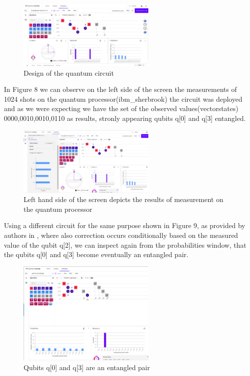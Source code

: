 \documentclass[12pt]{ieeetj}
\begin{document}
		\begin{figure}[H]
			\centering
			\includegraphics[width=0.6\textwidth]{ibmq/a.png}
			\caption{Design of the quantum circuit}
			\label{fig7:}
		\end{figure}		
		

		In Figure 8 we can observe on the left side of the screen the measurements of 1024 shots on the quantum processor(ibm\_sherbrook)
		the circuit was deployed and as we were expecting we have the set of the observed values(vectorstates)
		0000,0010,0010,0110 as results, stronly appearing qubits q[0] and q[3] entangled.

		\begin{figure}[H]
			\centering
			\includegraphics[width=0.6\textwidth]{ibmq/b.png}
			\caption{Left hand side of the screen depicts the results of measurement on the quantum processor}
			\label{fig8:}
		\end{figure}		
	


		Using a different circuit for the same purpose shown in Figure 9, as provided by authors in \cite{brief-intro},
		where also correction occurs conditionally based on the measured value of the qubit q[2],
		we can inspect again from the probabilities window, that the qubits q[0] and q[3] become eventually an entangled pair.

		\begin{figure}[H]
			\centering
			\includegraphics[width=0.6\textwidth]{ibmq/yale_circuit.png}
			\caption{Qubits q[0] and q[3] are an entangled pair}
			\label{fig9:}
		\end{figure}		
		
\end{document}
